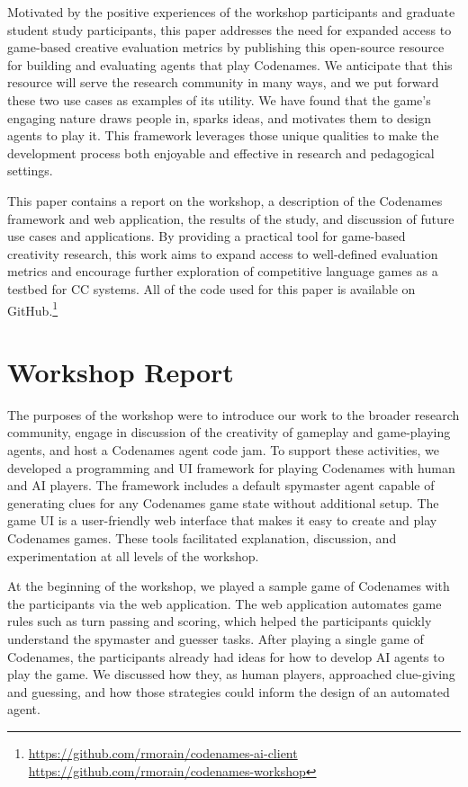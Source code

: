 \documentclass[phd,electronic,oneside,twosidetoc,letterpaper,chaptercenter,parttop,lof]{byumsphd}
\begin{document}
Motivated by the positive experiences of the workshop participants and graduate student study participants, this paper addresses the need for expanded access to game-based creative evaluation metrics by publishing this open-source resource for building and evaluating agents that play Codenames. We anticipate that this resource will serve the research community in many ways, and we put forward these two use cases as examples of its utility. We have found that the game's engaging nature draws people in, sparks ideas, and motivates them to design agents to play it. This framework leverages those unique qualities to make the development process both enjoyable and effective in research and pedagogical settings.

This paper contains a report on the workshop, a description of the Codenames framework and web application, the results of the study, and discussion of future use cases and applications. By providing a practical tool for game-based creativity research, this work aims to expand access to well-defined evaluation metrics and encourage further exploration of competitive language games as a testbed for CC systems. All of the code used for this paper is available on GitHub.\footnote{\url{https://github.com/rmorain/codenames-ai-client} \\\indent\indent\url{https://github.com/rmorain/codenames-workshop}}


\section{Workshop Report}

The purposes of the workshop were to introduce our work to the broader research community, engage in discussion of the creativity of gameplay and game-playing agents, and host a Codenames agent code jam. To support these activities, we developed a programming and UI framework for playing Codenames with human and AI players. The framework includes a default spymaster agent capable of generating clues for any Codenames game state without additional setup. The game UI is a user-friendly web interface that makes it easy to create and play Codenames games. These tools facilitated explanation, discussion, and experimentation at all levels of the workshop.

At the beginning of the workshop, we played a sample game of Codenames with the participants via the web application. The web application automates game rules such as turn passing and scoring, which helped the participants quickly understand the spymaster and guesser tasks. After playing a single game of Codenames, the participants already had ideas for how to develop AI agents to play the game. We discussed how they, as human players, approached clue-giving and guessing, and how those strategies could inform the design of an automated agent.
\end{document}
